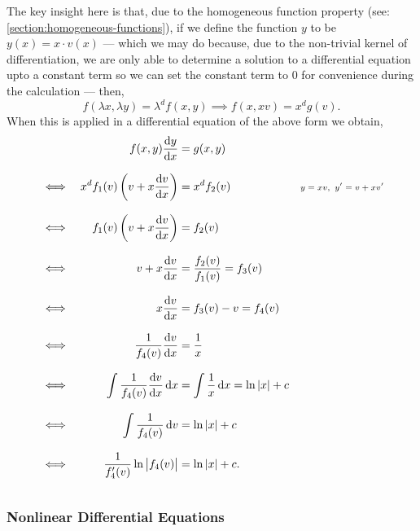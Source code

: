 \documentclass[../MathsNotesBase.tex]{subfiles}
\begin{document}
{		The key insight here is that, due to the homogeneous function property (see: \ref{section:homogeneous-functions}), if we define the function $y$ to be ${ y(x) = x \cdot v(x) }$ --- which we may do because, due to the non-trivial kernel of differentiation, we are only able to determine a solution to a differential equation upto a constant term so we can set the constant term to 0 for convenience during the calculation --- then,
		\[ f(\lambda x, \lambda y) = \lambda^d f(x,y) \implies f(x,xv) = x^d g(v). \]
		When this is applied in a differential equation of the above form we obtain,
		\begin{align*}
		&& f(x,y)\frac{\dif y}{\dif x} &= g(x,y) \\[8pt]
		&\iff & x^d f_1(v) \left(v + x\frac{\dif v}{\dif x}\right) &= x^d f_2(v) &\sidecomment{${y = xv,\,\, y' = v + xv'}$} \\[8pt]
		&\iff & f_1(v) \left(v + x\frac{\dif v}{\dif x}\right) &= f_2(v) &\sidecomment{} \\[8pt]
		&\iff & v + x\frac{\dif v}{\dif x} &= \frac{f_2(v)}{f_1(v)} = f_3(v) &\sidecomment{} \\[8pt]
		&\iff & x\frac{\dif v}{\dif x} &= f_3(v) - v = f_4(v) &\sidecomment{} \\[8pt]
		&\iff & \frac{1}{f_4(v)}\frac{\dif v}{\dif x} &= \frac{1}{x} &\sidecomment{} \\[8pt]
		&\iff & \int \frac{1}{f_4(v)}\frac{\dif v}{\dif x} \dif x &= \int \frac{1}{x} \dif x = \ln{\abs{x}} + c &\sidecomment{} \\[8pt]
		&\iff & \int \frac{1}{f_4(v)} \dif v &= \ln{\abs{x}} + c &\sidecomment{} \\[8pt]
		&\iff & \frac{1}{f_4'(v)} \ln{\abs{f_4(v)}} &= \ln{\abs{x}} + c. &\sidecomment{} \\[8pt]
		\end{align*}
	

	

	
		\pagebreak
		\subsubsection{Nonlinear Differential Equations}
		\bigskip
	}
\end{document}
